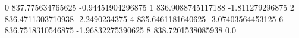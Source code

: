 0 837.775634765625 -0.94451904296875
1 836.9088745117188 -1.811279296875
2 836.4711303710938 -2.2490234375
4 835.6461181640625 -3.07403564453125
6 836.7518310546875 -1.96832275390625
8 838.7201538085938 0.0
